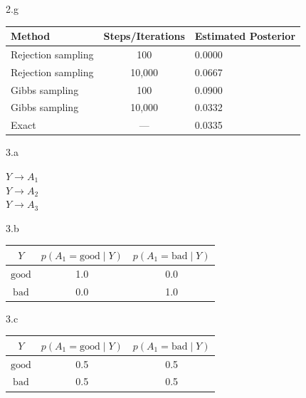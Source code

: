 \LARGE
2.g
\normalsize

\begin{answer}
  \begin{center}
  \begin{tabular}{|l|c|l|}
  \hline
  \textbf{Method} & \textbf{Steps/Iterations} & \textbf{Estimated Posterior} \\
  \hline
  Rejection sampling & 100 & 0.0000 \\
  Rejection sampling & 10,000 & 0.0667 \\
  Gibbs sampling & 100 & 0.0900 \\
  Gibbs sampling & 10,000 & 0.0332 \\
  Exact & --- & 0.0335 \\
  \hline
  \end{tabular}
  \end{center}
\end{answer}
\clearpage

\LARGE
3.a
\normalsize

\begin{answer}
  $Y \rightarrow A_1$ \\
  $Y \rightarrow A_2$ \\
  $Y \rightarrow A_3$
\end{answer}

\LARGE
3.b
\normalsize

\begin{answer}
  \begin{center}
  \begin{tabular}{|c|c|c|}
  \hline
  $Y$ & $p(A_1 = \text{good} \mid Y)$ & $p(A_1 = \text{bad} \mid Y)$ \\
  \hline
  $\text{good}$ & 1.0 & 0.0 \\
  $\text{bad}$  & 0.0 & 1.0 \\
  \hline
  \end{tabular}
  \end{center}
\end{answer}

\LARGE
3.c
\normalsize

\begin{answer}
  \begin{center}
  \begin{tabular}{|c|c|c|}
  \hline
  $Y$ & $p(A_1 = \text{good} \mid Y)$ & $p(A_1 = \text{bad} \mid Y)$ \\
  \hline
  $\text{good}$ & 0.5 & 0.5 \\
  $\text{bad}$  & 0.5 & 0.5 \\
  \hline
  \end{tabular}
  \end{center}
\end{answer}

